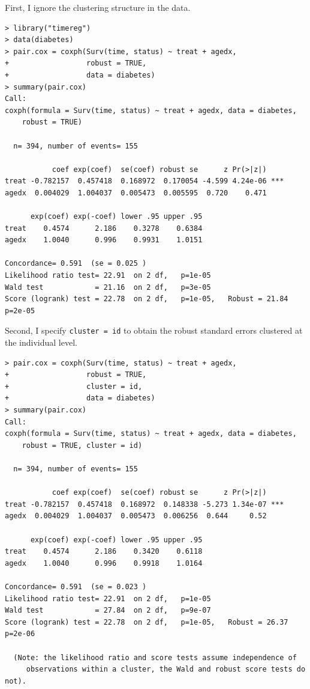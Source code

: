 First, I ignore the clustering structure in the data.  
 \begin{lstlisting}
> library("timereg")
> data(diabetes)
> pair.cox = coxph(Surv(time, status) ~ treat + agedx,
+                  robust = TRUE, 
+                  data = diabetes)
> summary(pair.cox)
Call:
coxph(formula = Surv(time, status) ~ treat + agedx, data = diabetes, 
    robust = TRUE)

  n= 394, number of events= 155 

           coef exp(coef)  se(coef) robust se      z Pr(>|z|)    
treat -0.782157  0.457418  0.168972  0.170054 -4.599 4.24e-06 ***
agedx  0.004029  1.004037  0.005473  0.005595  0.720    0.471    

      exp(coef) exp(-coef) lower .95 upper .95
treat    0.4574      2.186    0.3278    0.6384
agedx    1.0040      0.996    0.9931    1.0151

Concordance= 0.591  (se = 0.025 )
Likelihood ratio test= 22.91  on 2 df,   p=1e-05
Wald test            = 21.16  on 2 df,   p=3e-05
Score (logrank) test = 22.78  on 2 df,   p=1e-05,   Robust = 21.84  p=2e-05
 \end{lstlisting}   
 
 
Second, I specify \texttt{cluster = id} to obtain the robust standard errors clustered at the individual level.

 \begin{lstlisting}
> pair.cox = coxph(Surv(time, status) ~ treat + agedx,
+                  robust = TRUE, 
+                  cluster = id,
+                  data = diabetes)
> summary(pair.cox)
Call:
coxph(formula = Surv(time, status) ~ treat + agedx, data = diabetes, 
    robust = TRUE, cluster = id)

  n= 394, number of events= 155 

           coef exp(coef)  se(coef) robust se      z Pr(>|z|)    
treat -0.782157  0.457418  0.168972  0.148338 -5.273 1.34e-07 ***
agedx  0.004029  1.004037  0.005473  0.006256  0.644     0.52    

      exp(coef) exp(-coef) lower .95 upper .95
treat    0.4574      2.186    0.3420    0.6118
agedx    1.0040      0.996    0.9918    1.0164

Concordance= 0.591  (se = 0.023 )
Likelihood ratio test= 22.91  on 2 df,   p=1e-05
Wald test            = 27.84  on 2 df,   p=9e-07
Score (logrank) test = 22.78  on 2 df,   p=1e-05,   Robust = 26.37  p=2e-06

  (Note: the likelihood ratio and score tests assume independence of
     observations within a cluster, the Wald and robust score tests do not).  
 \end{lstlisting}   
 
